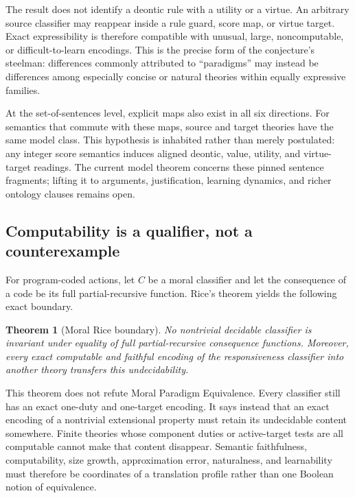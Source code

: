 \documentclass[11pt]{article}
\newtheorem{theorem}{Theorem}
\theoremstyle{definition}
\theoremstyle{remark}
\begin{document}
The result does not identify a deontic rule with a utility or a virtue.  An
arbitrary source classifier may reappear inside a rule guard, score map, or
virtue target.  Exact expressibility is therefore compatible with unusual,
large, noncomputable, or difficult-to-learn encodings.  This is the precise
form of the conjecture's steelman: differences commonly attributed to
``paradigms'' may instead be differences among especially concise or natural
theories within equally expressive families.

At the set-of-sentences level, explicit maps also exist in all six directions.
For semantics that commute with these maps, source and target theories have the
same model class.  This hypothesis is inhabited rather than merely postulated:
any integer score semantics induces aligned deontic, value, utility, and
virtue-target readings.  The current model theorem concerns these pinned
sentence fragments; lifting it to arguments, justification, learning dynamics,
and richer ontology clauses remains open.

\subsection{Computability is a qualifier, not a counterexample}

For program-coded actions, let $C$ be a moral classifier and let the consequence
of a code be its full partial-recursive function.  Rice's theorem yields the
following exact boundary.

\begin{theorem}[Moral Rice boundary]
No nontrivial decidable classifier is invariant under equality of full
partial-recursive consequence functions.  Moreover, every exact computable and
faithful encoding of the responsiveness classifier into another theory transfers
this undecidability.
\end{theorem}

This theorem does not refute Moral Paradigm Equivalence.  Every classifier still
has an exact one-duty and one-target encoding.  It says instead that an exact
encoding of a nontrivial extensional property must retain its undecidable content
somewhere.  Finite theories whose component duties or active-target tests are all
computable cannot make that content disappear.  Semantic faithfulness,
computability, size growth, approximation error, naturalness, and learnability
must therefore be coordinates of a translation profile rather than one Boolean
notion of equivalence.
\end{document}

